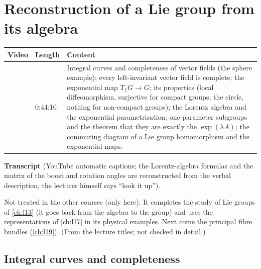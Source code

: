 \chapter{Reconstruction of a Lie group from its algebra}\label{ch:l18}
\begin{paracol}{2}

\begin{sources}
\begin{tabularx}{\linewidth}{@{}l l L@{}}
\toprule
\textbf{Video} & \textbf{Length} & \textbf{Content}\\
\midrule
{} & 0:44:10 & Integral curves and completeness of vector fields (the sphere example); every left-invariant vector field is complete; the exponential map $T_{\mathbb 1}G\to G$; its properties (local diffeomorphism, surjective for compact groups, the circle, nothing for non-compact groups); the Lorentz algebra and the exponential parametrisation; one-parameter subgroups and the theorem that they are exactly the $\exp(\lambda A)$; the commuting diagram of a Lie group homomorphism and the exponential maps.\\
\bottomrule
\end{tabularx}

\smallskip
\textbf{Transcript}  (YouTube automatic captions; the Lorentz-algebra formulas and the matrix of the boost and rotation angles are reconstructed from the verbal description, the lecturer himself says ``look it up'').
\end{sources}

\begin{reading}
Not treated in the other courses (only here). It completes the study of Lie groups of \cref{ch:l13} (it goes back from the algebra to the group) and uses the representations of \cref{ch:l17} in its physical examples. Next come the principal fibre bundles (\cref{ch:l19}). (From the lecture titles; not checked in detail.)
\end{reading}

\section{Integral curves and completeness}\label{sec:rc-curves}


\end{paracol}
